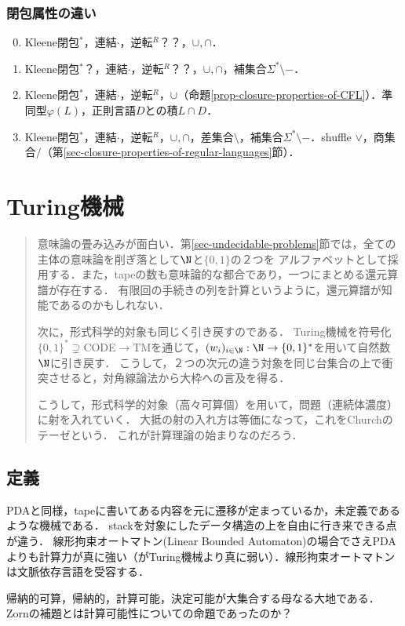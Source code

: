 \subsection{閉包属性の違い}

\begin{enumerate}\setcounter{enumi}{-1}
    \item Kleene閉包${}^*$，連結$\cdot$，逆転${}^R$？？，$\cup,\cap$．
    \item Kleene閉包${}^*$？，連結$\cdot$，逆転${}^R$？？，$\cup,\cap$，補集合$\Sigma^*\setminus-$．
    \item Kleene閉包${}^*$，連結$\cdot$，逆転${}^R$，$\cup$（命題\ref{prop-closure-properties-of-CFL}）．準同型$\varphi(L)$，正則言語$D$との積$L\cap D$．
    \item Kleene閉包${}^*$，連結$\cdot$，逆転${}^R$，$\cup,\cap$，差集合$\setminus$，補集合$\Sigma^*\setminus-$．shuffle $\lor$，商集合$/$（第\ref{sec-closure-properties-of-regular-languages}節）．
\end{enumerate}

\chapter{Turing機械}

\begin{quotation}
    意味論の畳み込みが面白い．第\ref{sec-undecidable-problems}節では，全ての主体の意味論を削ぎ落として$\N$と$\{0,1\}$の２つを
    アルファベットとして採用する．また，tapeの数も意味論的な都合であり，一つにまとめる還元算譜が存在する．
    有限回の手続きの列を計算というように，還元算譜が知能であるのかもしれない．

    次に，形式科学的対象も同じく引き戻すのである．
    Turing機械を符号化$\{0,1\}^*\supsetneq$CODE$\to$TMを通じて，$(w_i)_{i\in\N}:\N\to\{0,1\}^*$を用いて自然数$\N$に引き戻す．
    こうして，２つの次元の違う対象を同じ台集合の上で衝突させると，対角線論法から大枠への言及を得る．

    こうして，形式科学的対象（高々可算個）を用いて，問題（連続体濃度）に射を入れていく．
    大抵の射の入れ方は等価になって，これをChurchのテーゼという．
    これが計算理論の始まりなのだろう．
\end{quotation}

\section{定義}

\begin{tcolorbox}[colframe=ForestGreen, colback=ForestGreen!10!white, breakable]
    PDAと同様，tapeに書いてある内容を元に遷移が定まっているか，未定義であるような機械である．
    stackを対象にしたデータ構造の上を自由に行き来できる点が違う．
    線形拘束オートマトン(Linear Bounded Automaton)の場合でさえPDAよりも計算力が真に強い（がTuring機械より真に弱い）．線形拘束オートマトンは文脈依存言語を受容する．

    帰納的可算，帰納的，計算可能，決定可能が大集合する母なる大地である．
    Zornの補題とは計算可能性についての命題であったのか？
\end{tcolorbox}

